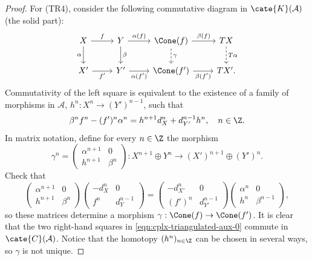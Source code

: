 \begin{proof}
	For (TR4), consider the following commutative diagram in
	$\cate{K}(\mathcal{A})$ (the solid part):
	\begin{equation}\label{eqn:cplx-triangulated-aux-0}\begin{tikzcd}
		X \arrow[d, "\alpha"'] \arrow[r, "f"] & Y \arrow[r, "\alpha(f)"] \arrow[d, "\beta"] & \Cone(f) \arrow[r, "\beta(f)"] \arrow[dashed, d, "\gamma"] & TX \arrow[dashed, d, "T\alpha"] \\
		X' \arrow[r, "{f'}"'] & Y' \arrow[r, "{\alpha(f')}"'] & \Cone(f') \arrow[r, "{\beta(f')}"'] & T X' .
	\end{tikzcd}\end{equation}
	Commutativity of the left square is equivalent to the existence of a
	family of morphisms in $\mathcal{A}$,
	$h^n: X^n \to (Y')^{n-1}$, such that
	\[ \beta^n f^n - (f')^n \alpha^n = h^{n+1} d_X^n + d_{Y'}^{n-1} h^n , \quad n \in \Z . \]
	In matrix notation, define for every $n \in \Z$ the morphism
	\[ \gamma^n = \begin{pmatrix} \alpha^{n+1} & 0 \\ h^{n+1} & \beta^n \end{pmatrix} : X^{n+1} \oplus Y^n \to (X')^{n+1} \oplus (Y')^n . \]
	Check that
	\[ \begin{pmatrix} \alpha^{n+1} & 0 \\ h^{n+1} & \beta^n \end{pmatrix} \begin{pmatrix} -d_X^n & 0 \\ f^n & d_Y^{n-1} \end{pmatrix}
	= \begin{pmatrix} -d_{X'}^n & 0 \\ (f')^n & d_{Y'}^{n-1} \end{pmatrix} \begin{pmatrix} \alpha^n & 0 \\ h^n & \beta^{n-1} \end{pmatrix}, \]
	so these matrices determine a morphism
	$\gamma: \Cone(f) \to \Cone(f')$. It is clear that the two right-hand
	squares in \eqref{eqn:cplx-triangulated-aux-0} commute in
	$\cate{C}(\mathcal{A})$. Notice that the homotopy
	$(h^n)_{n \in \Z}$ can be chosen in several ways, so $\gamma$ is not
	unique.


\end{proof}
